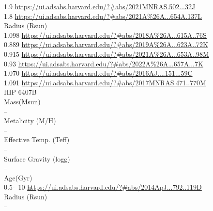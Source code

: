 1.9	 \url{https://ui.adsabs.harvard.edu/?#abs/2021MNRAS.502...32J}\\
1.8 \url{https://ui.adsabs.harvard.edu/?#abs/2021A%26A...654A.137L}\\
Radius (Rsun)\\
1.098 \url{https://ui.adsabs.harvard.edu/?#abs/2018A%26A...615A..76S}\\
0.889 \url{https://ui.adsabs.harvard.edu/?#abs/2019A%26A...623A..72K}\\
0.915 \url{https://ui.adsabs.harvard.edu/?#abs/2021A%26A...653A..98M}\\
0.93 \url{https://ui.adsabs.harvard.edu/?#abs/2022A%26A...657A...7K}\\
1.070 \url{https://ui.adsabs.harvard.edu/?#abs/2016AJ....151...59C}\\
1.091 \url{https://ui.adsabs.harvard.edu/?#abs/2017MNRAS.471..770M}\\
HIP 6407B\\
Mass(Msun)\\
--\\
Metalicity (M/H)\\
--\\
Effective Temp. (Teff)\\
--\\
Surface Gravity (logg)\\
--\\
Age(Gyr)\\
0.5-~10 \url{https://ui.adsabs.harvard.edu/?#abs/2014ApJ...792..119D}\\
Radius (Rsun)\\
--\\